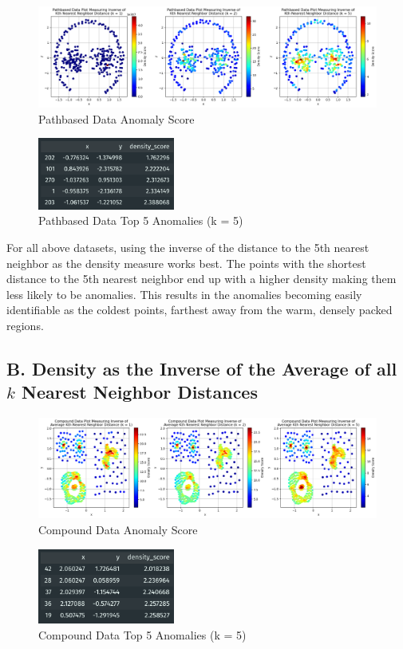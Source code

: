 \documentclass{article}
\begin{document}
\begin{figure}[H]
    \centering
    \includegraphics[width=\textwidth]{p3_p3a.png}
    \caption{Pathbased Data Anomaly Score}
\end{figure}
\begin{figure}[H]
    \centering
    \includegraphics[width=0.4\textwidth]{p3_d3a.png}
    \caption{Pathbased Data Top 5 Anomalies (k = 5)}
\end{figure}

For all above datasets, using the inverse of the distance to the 5th nearest neighbor as
the density measure works best. The points with the shortest distance to the 5th nearest
neighbor end up with a higher density making them less likely to be anomalies. This
results in the anomalies becoming easily identifiable as the coldest points, farthest away
from the warm, densely packed regions.

\subsection{B. Density as the Inverse of the Average of all $k$ Nearest Neighbor Distances}
\begin{figure}[H]
    \centering
    \includegraphics[width=\textwidth]{p3_p1b.png}
    \caption{Compound Data Anomaly Score}
\end{figure}
\begin{figure}[H]
    \centering
    \includegraphics[width=0.4\textwidth]{p3_d1b.png}
    \caption{Compound Data Top 5 Anomalies (k = 5)}
\end{figure}
\end{document}
